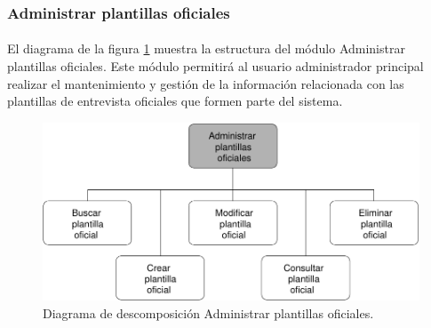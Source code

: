 \subsubsection{Administrar plantillas oficiales}

  \paragraph{}El diagrama de la figura
  \ref{diagramaDescomposicionAdministrarPlantillasOficiales} muestra la
  estructura del módulo Administrar plantillas oficiales. Este módulo permitirá
  al usuario administrador principal realizar el mantenimiento y gestión de la
  información relacionada con las plantillas de entrevista oficiales que formen
  parte del sistema.

  \begin{figure}[!ht]
    \begin{center}
      \includegraphics[]{11.Disenyo_Arquitectonico/11.2.Diagramas_Descomposicion/11.2.2.Modulo_administrador_principal/AdministrarBBDD/AdministrarPlantillasOficiales/Diagramas/administrar_plantillas_oficiales.pdf}
      \caption{Diagrama de descomposición Administrar plantillas oficiales.}
      \label{diagramaDescomposicionAdministrarPlantillasOficiales}
    \end{center}
  \end{figure}
